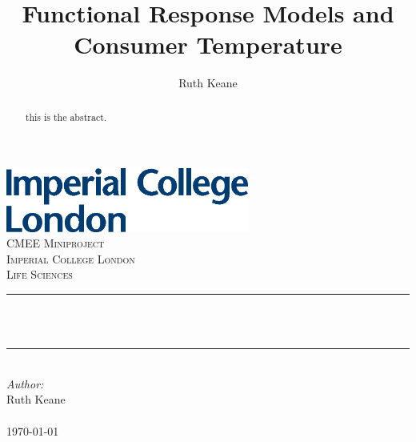 \documentclass{article}
\begin{document}
\title{Functional Response Models and Consumer Temperature}%
\author{Ruth Keane}
\begin{titlepage}
\newcommand{\HRule}{\rule{\linewidth}{1mm}}
\includegraphics[width=8cm]{logo.eps}\\[1cm] 
\center 
\textsc{\LARGE CMEE Miniproject}\\[1.5cm] 
\textsc{\Large Imperial College London}\\[0.5cm]
\textsc{\large Life Sciences}\\[0.5cm] 
\makeatletter
\HRule \\[0.4cm]
{ \huge \bfseries \@title}\\[0.4cm] %
\HRule \\[1.5cm]
\makeatother
\Large \emph{Author:}\\
Ruth Keane \\[3cm] %
\\
{\large \today}\\[2cm] %
\vfill %
\clearpage
\end{titlepage}
\linenumbers
\begin{abstract}
this is the abstract.
\end{abstract}
\end{document}
